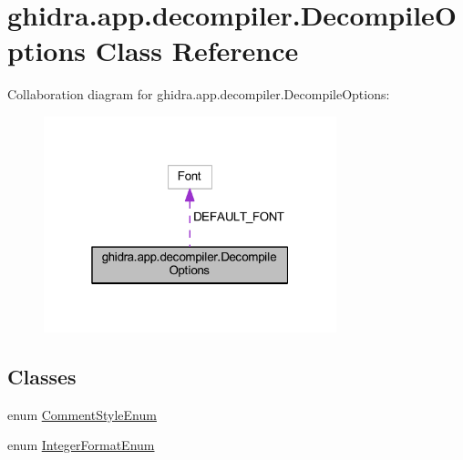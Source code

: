 \hypertarget{classghidra_1_1app_1_1decompiler_1_1_decompile_options}{}\section{ghidra.\+app.\+decompiler.\+Decompile\+Options Class Reference}
\label{classghidra_1_1app_1_1decompiler_1_1_decompile_options}


Collaboration diagram for ghidra.\+app.\+decompiler.\+Decompile\+Options\+:
\nopagebreak
\begin{figure}[H]
\begin{center}
\leavevmode
\includegraphics[width=241pt]{classghidra_1_1app_1_1decompiler_1_1_decompile_options__coll__graph}
\end{center}
\end{figure}
\subsection*{Classes}
\begin{DoxyCompactItemize}
\item 
enum \mbox{\hyperlink{enumghidra_1_1app_1_1decompiler_1_1_decompile_options_1_1_comment_style_enum}{Comment\+Style\+Enum}}
\item 
enum \mbox{\hyperlink{enumghidra_1_1app_1_1decompiler_1_1_decompile_options_1_1_integer_format_enum}{Integer\+Format\+Enum}}
\end{DoxyCompactItemize}
